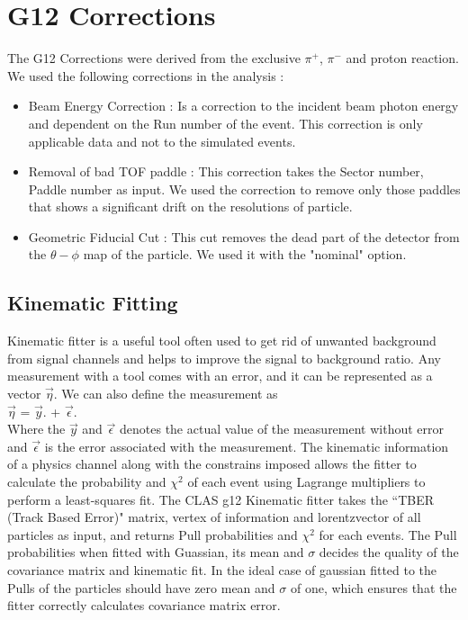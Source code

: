 \documentclass[12pt,a4paper]{amsbook}
\theoremstyle{definition}
\begin{document}
{\section{G12 Corrections}
\label{Cor}
The G12 Corrections were derived from the exclusive $\pi^{+}$, $\pi^{-}$ and proton reaction. We used the following corrections in the analysis :
    
\begin {itemize}
\item Beam Energy Correction : Is a correction to the incident beam photon energy and dependent on the Run number of the event. This correction is only applicable data and not to the simulated events.
\item Removal of bad TOF paddle : This correction takes the Sector number, Paddle number as input. We used the correction to remove only those paddles that shows a significant drift on the resolutions of particle.   
\item  Geometric Fiducial Cut : This cut removes the dead part of the detector from the $\theta-\phi$ map of the particle. We used it with the "nominal" option. 
\end {itemize}

\subsection{Kinematic Fitting}
\label{KF}
Kinematic fitter is a useful tool often used to get rid of unwanted background from signal channels and helps to improve the signal to background ratio.  Any measurement with a tool comes with an error, and it can be represented as a vector  $\vec{\eta}$. We can also define the measurement as 
\\ $\vec{\eta}$ =  $\vec{y}$. +  $\vec{\epsilon}$.\\
Where the $\vec{y}$ and $\vec{\epsilon}$ denotes the actual value of the measurement without error and $\vec{\epsilon}$ is the error associated with the measurement. The kinematic information of a physics channel along with the constrains imposed allows the fitter to calculate the probability and $\chi^{2}$ of each event using Lagrange multipliers to perform a least-squares fit. The CLAS g12 Kinematic fitter takes the ``TBER (Track Based Error)" matrix, vertex of information and lorentzvector of all particles as input, and returns Pull probabilities and $\chi^{2}$ for each events. The Pull probabilities when fitted with Guassian, its mean and $\sigma$ decides the quality of the covariance matrix and kinematic fit. In the ideal case of gaussian fitted to the Pulls of the particles should have  zero mean and $\sigma$ of one, which ensures that the fitter correctly calculates covariance matrix error. 
  
}
\end{document}
